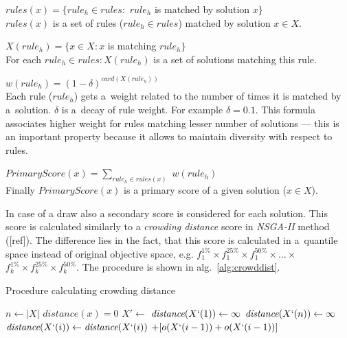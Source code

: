 \begin{description}
\item $\textit{rules}(x) = \{\textit{rule}_h \in \textit{rules} :$
$\textit{rule}_h$ is matched by solution $x\}$ \\
$\textit{rules}(x)$ is a set of rules ($\textit{rule}_h \in \textit{rules}$)
matched by solution $x \in X$. 

\item $X(\textit{rule}_h) = \{x \in X: x$ is matching $\textit{rule}_h\}$
\\ For each $\textit{rule}_h \in rules: X(\textit{rule}_h)$ is a set of
solutions matching this rule.

\item $w(\textit{rule}_h) = (1 - \delta)^{\textit{card}(X(\textit{rule}_h))}$
  \\ Each rule ($\textit{rule}_h$) gets a~weight related to the number of
  times it is matched by a~solution. $\delta$ is a~decay of rule weight. For
  example $\delta = 0.1$. This formula associates higher weight for rules
  matching lesser number of solutions --- this is an important property
  because it allows to maintain diversity with respect to rules.

\item $\textit{PrimaryScore}(x) = \sum_{\textit{rule}_h \in rules(x)}$
  $w(\textit{rule}_h)$ \\ Finally $\textit{PrimaryScore}(x)$ is a primary
  score of a given solution ($x \in X$).
\end{description}

In case of a draw also a secondary score is considered for each solution. This
score is calculated similarly to a \textit{crowding distance} score in
\textit{NSGA-II} method ([ref]). The difference lies in the fact, that this
score is calculated in a~quantile space instead of original objective space,
e.g. $f^{1\%}_1 \times f^{25\%}_1 \times f^{50\%}_1 \times \dots \times $
$f^{1\%}_k \times f^{25\%}_k \times f^{50\%}_k$. The procedure is shown in
alg.~\ref{alg:crowddist}.


\begin{algorithm}
  \caption{Procedure calculating crowding distance}\label{alg:crowddist}
  \begin{algorithmic}[1]
    \State $n \gets |X|$ 
     
    \State $\textit{distance}(x) = 0$
    \EndFor
    \State $X' \gets$  
    \State $\textit{distance}(X`(1)) \gets \infty$ 
    \State $\textit{distance}(X`(n)) \gets \infty$ 
    \EndFor
     
    \State $\textit{distance}(X`(i)) \gets \textit{distance}(X`(i))$
    $+ [o(X`(i-1)) + o(X`(i-1))]$
    \EndFor
    \EndProcedure{}
  \end{algorithmic}
\end{algorithm}

